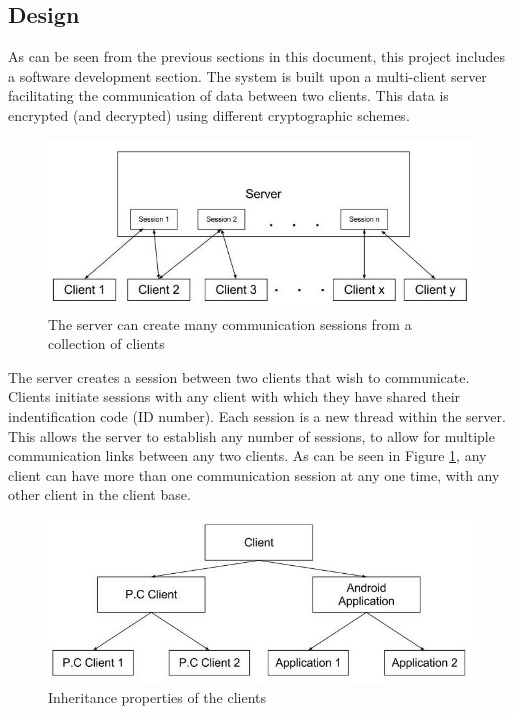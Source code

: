 \documentclass[a4paper,11pt]{article}
\begin{document}
\subsection{Design}

As can be seen from the previous sections in this document, this project includes a software development section. The system is built upon a multi-client server facilitating the communication of data between two clients.  This data is encrypted (and decrypted) using different cryptographic schemes.

\begin{figure}[htb]
\centering
\includegraphics[scale=0.35]{designs1.jpg}
\caption{The server can create many communication sessions from a collection of clients}
\label{fig:designs1}
\end{figure}

The server creates a session between two clients that wish to communicate. Clients initiate sessions with any client with which they have shared their indentification code (ID number). Each session is a new thread within the server. This allows the server to establish any number of sessions, to allow for multiple communication links between any two clients. As can be seen in Figure \ref{fig:designs1}, any client can have more than one communication session at any one time, with any other client in the client base.

\begin{figure}[htb]
\centering
\includegraphics[scale=0.35]{designs2.jpg}
\caption{Inheritance properties of the clients}
\label{fig:designs2}
\end{figure}
\end{document}
